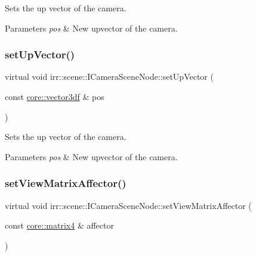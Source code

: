Sets the up vector of the camera. 


\begin{DoxyParams}{Parameters}
{\em pos} & New upvector of the camera. \\
\hline
\end{DoxyParams}
\mbox{\label{classirr_1_1scene_1_1ICameraSceneNode_a1e74c17d89979fde4738276ccdcc0d3a}} 
\subsubsection{\texorpdfstring{set\+Up\+Vector()}{setUpVector()}\hspace{0.1cm}{\footnotesize\ttfamily [2/2]}}
{\footnotesize\ttfamily virtual void irr\+::scene\+::\+I\+Camera\+Scene\+Node\+::set\+Up\+Vector (\begin{DoxyParamCaption}\item[{const \hyperlink{namespaceirr_1_1core_ae6e2b2a6c552833ebbd5b7463d03586b}{core\+::vector3df} \&}]{pos }\end{DoxyParamCaption})\hspace{0.3cm}{\ttfamily [pure virtual]}}



Sets the up vector of the camera. 


\begin{DoxyParams}{Parameters}
{\em pos} & New upvector of the camera. \\
\hline
\end{DoxyParams}
\mbox{\label{classirr_1_1scene_1_1ICameraSceneNode_adb3500cac2a8a47e6a3f48aa343ce2fd}} 
\subsubsection{\texorpdfstring{set\+View\+Matrix\+Affector()}{setViewMatrixAffector()}\hspace{0.1cm}{\footnotesize\ttfamily [1/2]}}
{\footnotesize\ttfamily virtual void irr\+::scene\+::\+I\+Camera\+Scene\+Node\+::set\+View\+Matrix\+Affector (\begin{DoxyParamCaption}\item[{const \hyperlink{namespaceirr_1_1core_a4c9d4e29899535971052810954a14431}{core\+::matrix4} \&}]{affector }\end{DoxyParamCaption})\hspace{0.3cm}{\ttfamily [pure virtual]}}



